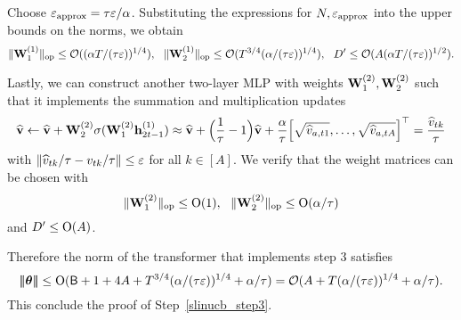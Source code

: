  Choose $\varepsilon_{{\mathrm{approx}}}={\tau}\varepsilon/\alpha$. Substituting the expressions for $N,\varepsilon_{\mathrm{approx}}$ into the upper bounds on the norms, we obtain
 $$\|{{\mathbf W}_1^{(1)}}\|_{\mathrm{op}}\leq \mathcal{O}(({\alpha T/({\tau}\varepsilon)})^{1/4}),~~\|{{\mathbf W}_2^{(1)}}\|_{\mathrm{op}}\leq \mathcal{O}(T^{3/4}({\alpha/({\tau}\varepsilon)})^{1/4}),~~{D'}\leq \mathcal{O}(A({\alpha T/({\tau}\varepsilon)})^{1/2}).$$

 
 Lastly, we can construct another two-layer MLP with weights ${\mathbf W}^{(2)}_1,{\mathbf W}^{(2)}_2$ such that it implements the summation and multiplication updates 
 \begin{align*}
 \widehat{{\mathbf v}}\leftarrow\widehat{{\mathbf v}}+{\mathbf W}^{(2)}_2\sigma({\mathbf W}^{(2)}_1{\mathbf h}_{2t-1}^{(1)})\approx\widehat{{\mathbf v}}+\Big(\frac1{{\tau}}-1\Big)\widehat{{\mathbf v}}+\frac\alpha{{\tau}}\Big[\sqrt{ \widehat v_{a,t1}},\ldots,\sqrt{ \widehat v_{a,tA}}\Big]^\top=\frac{\widehat v_{tk}}{{\tau}}
 \end{align*}
with $\|\widehat v_{tk}/{\tau}-v_{tk}/{\tau}\|\leq \varepsilon$ for all $k\in[A]$. We verify that the weight matrices can be chosen with
  $$
 \|{{\mathbf W}^{(2)}_1}\|_{\mathrm{op}}\leq {\mathrm{O}}(1),~~ \|{{\mathbf W}^{(2)}_2}\|_{\mathrm{op}}\leq {\mathrm{O}}(\alpha/{\tau})
 $$ and ${D'}\leq {\mathrm{O}}(A)$.

 Therefore the norm of the transformer that implements step 3 satisfies $$
 {\left|\!\left|\!\left|{{\boldsymbol \theta}}\right|\!\right|\!\right|}\leq {\mathrm{O}}({\mathsf{B}}+1+4A+T^{3/4}({\alpha/({\tau}\varepsilon)})^{1/4}+{\alpha}/{\tau})=
 \mathcal{O}(A+T({\alpha/({\tau}\varepsilon)})^{1/4}+\alpha/{\tau}).$$  This conclude the proof of Step~\ref{slinucb_step3}. 















